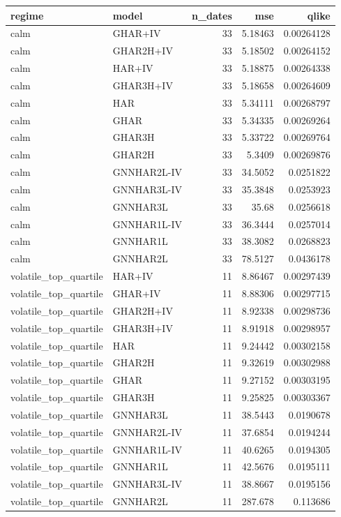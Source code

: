 \begin{tabular}{llrrr}
\toprule
regime & model & n_dates & mse & qlike \\
\midrule
calm & GHAR+IV & 33 & 5.18463 & 0.00264128 \\
calm & GHAR2H+IV & 33 & 5.18502 & 0.00264152 \\
calm & HAR+IV & 33 & 5.18875 & 0.00264338 \\
calm & GHAR3H+IV & 33 & 5.18658 & 0.00264609 \\
calm & HAR & 33 & 5.34111 & 0.00268797 \\
calm & GHAR & 33 & 5.34335 & 0.00269264 \\
calm & GHAR3H & 33 & 5.33722 & 0.00269764 \\
calm & GHAR2H & 33 & 5.3409 & 0.00269876 \\
calm & GNNHAR2L-IV & 33 & 34.5052 & 0.0251822 \\
calm & GNNHAR3L-IV & 33 & 35.3848 & 0.0253923 \\
calm & GNNHAR3L & 33 & 35.68 & 0.0256618 \\
calm & GNNHAR1L-IV & 33 & 36.3444 & 0.0257014 \\
calm & GNNHAR1L & 33 & 38.3082 & 0.0268823 \\
calm & GNNHAR2L & 33 & 78.5127 & 0.0436178 \\
volatile_top_quartile & HAR+IV & 11 & 8.86467 & 0.00297439 \\
volatile_top_quartile & GHAR+IV & 11 & 8.88306 & 0.00297715 \\
volatile_top_quartile & GHAR2H+IV & 11 & 8.92338 & 0.00298736 \\
volatile_top_quartile & GHAR3H+IV & 11 & 8.91918 & 0.00298957 \\
volatile_top_quartile & HAR & 11 & 9.24442 & 0.00302158 \\
volatile_top_quartile & GHAR2H & 11 & 9.32619 & 0.00302988 \\
volatile_top_quartile & GHAR & 11 & 9.27152 & 0.00303195 \\
volatile_top_quartile & GHAR3H & 11 & 9.25825 & 0.00303367 \\
volatile_top_quartile & GNNHAR3L & 11 & 38.5443 & 0.0190678 \\
volatile_top_quartile & GNNHAR2L-IV & 11 & 37.6854 & 0.0194244 \\
volatile_top_quartile & GNNHAR1L-IV & 11 & 40.6265 & 0.0194305 \\
volatile_top_quartile & GNNHAR1L & 11 & 42.5676 & 0.0195111 \\
volatile_top_quartile & GNNHAR3L-IV & 11 & 38.8667 & 0.0195156 \\
volatile_top_quartile & GNNHAR2L & 11 & 287.678 & 0.113686 \\
\bottomrule
\end{tabular}
